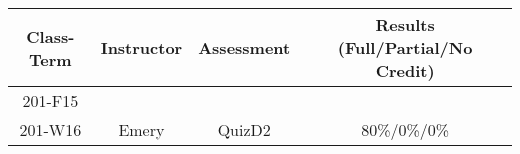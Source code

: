 \begin{outcomes}
	\begin{center}
		\begin{tabular}{cccc}
			\hline\hline
                Class-Term & Instructor & Assessment & Results (Full/Partial/No Credit) \\
			\hline
                201-F15 &  &  &  \\
                201-W16 & Emery & QuizD2 & 80\%/0\%/0\%\\
			\hline
		\end{tabular}
	\end{center}
\end{outcomes}

\begin{comments}
	
\end{comments}
